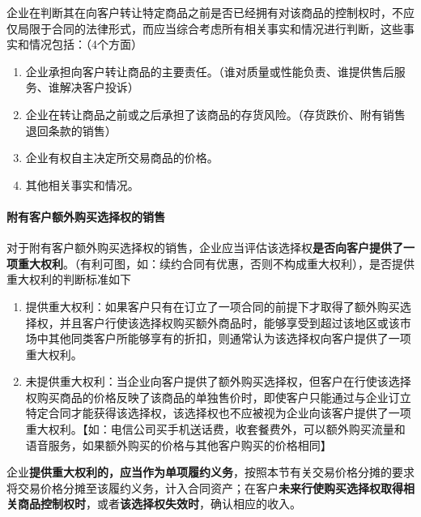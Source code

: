 \documentclass[UTF8,12pt]{ctexart}
\numberwithin{equation}{section} %
\numberwithin{figure}{section}
\numberwithin{table}{section}
\begin{document}
	企业在判断其在向客户转让特定商品之前是否已经拥有对该商品的控制权时，不应仅局限于合同的法律形式，而应当综合考虑所有相关事实和情况进行判断，这些事实和情况包括：（4个方面）
	\begin{enumerate}
		\item 企业承担向客户转让商品的主要责任。（谁对质量或性能负责、谁提供售后服务、谁解决客户投诉）
		
		\item 企业在转让商品之前或之后承担了该商品的存货风险。（存货跌价、附有销售退回条款的销售）
		
		\item 企业有权自主决定所交易商品的价格。
		
		\item 其他相关事实和情况。
	\end{enumerate}


	\paragraph{附有客户额外购买选择权的销售}
	对于附有客户额外购买选择权的销售，企业应当评估该选择权\textbf{是否向客户提供了一项重大权利}。（有利可图，如：续约合同有优惠，否则不构成重大权利），是否提供重大权利的判断标准如下
	\begin{enumerate}
		\item 提供重大权利：如果客户只有在订立了一项合同的前提下才取得了额外购买选择权，并且客户行使该选择权购买额外商品时，能够享受到超过该地区或该市场中其他同类客户所能够享有的折扣，则通常认为该选择权向客户提供了一项重大权利。
		
		\item 未提供重大权利：当企业向客户提供了额外购买选择权，但客户在行使该选择权购买商品的价格反映了该商品的单独售价时，即使客户只能通过与企业订立特定合同才能获得该选择权，该选择权也不应被视为企业向该客户提供了一项重大权利。【如：电信公司买手机送话费，收套餐费外，可以额外购买流量和语音服务，如果额外购买的价格与其他客户购买的价格相同】
	\end{enumerate}
	
	企业\textbf{提供重大权利的，应当作为单项履约义务}，按照本节有关交易价格分摊的要求将交易价格分摊至该履约义务，计入合同资产；在客户\textbf{未来行使购买选择权取得相关商品控制权时}，或者\textbf{该选择权失效时}，确认相应的收入。
	
\end{document}
